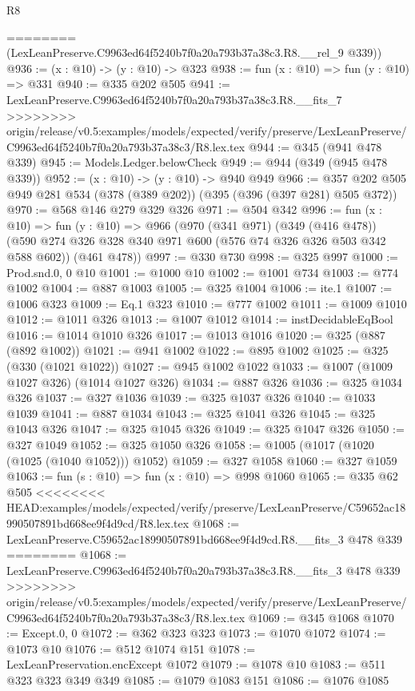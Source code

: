 \begin{lexlean}{R8}
\begin{coremodule}
{{{{{{{{{{{{{{{{{{{{{{{========
      (LexLeanPreserve.C9963ed64f5240b7f0a20a793b37a38c3.R8.__rel_9 @339))
@936 := (x : @10) -> (y : @10) -> @323
@938 := fun (x : @10) => fun (y : @10) => @331
@940 := @335 @202 @505
@941 := LexLeanPreserve.C9963ed64f5240b7f0a20a793b37a38c3.R8.__fits_7
>>>>>>>> origin/release/v0.5:examples/models/expected/verify/preserve/LexLeanPreserve/C9963ed64f5240b7f0a20a793b37a38c3/R8.lex.tex
@944 := @345 (@941 @478 @339)
@945 := Models.Ledger.belowCheck
@949 := @944 (@349 (@945 @478 @339))
@952 := (x : @10) -> (y : @10) -> @940 @949
@966 := @357 @202 @505 @949 @281 @534 (@378 (@389 @202)) (@395 (@396 (@397 @281) @505 @372))
@970 := @568 @146 @279 @329 @326
@971 := @504 @342
@996 := fun (x : @10) =>
  fun (y : @10) =>
  @966
    (@970
      (@341 @971)
      (@349 (@416 @478))
      (@590 @274 @326 @328 @340 @971 @600 (@576 @74 @326 @326 @503 @342 @588 @602))
      (@461 @478))
@997 := @330 @730
@998 := @325 @997
@1000 := Prod.snd.{0, 0} @10
@1001 := @1000 @10
@1002 := @1001 @734
@1003 := @774 @1002
@1004 := @887 @1003
@1005 := @325 @1004
@1006 := ite.{1}
@1007 := @1006 @323
@1009 := Eq.{1} @323
@1010 := @777 @1002
@1011 := @1009 @1010
@1012 := @1011 @326
@1013 := @1007 @1012
@1014 := instDecidableEqBool
@1016 := @1014 @1010 @326
@1017 := @1013 @1016
@1020 := @325 (@887 (@892 @1002))
@1021 := @941 @1002
@1022 := @895 @1002
@1025 := @325 (@330 (@1021 @1022))
@1027 := @945 @1002 @1022
@1033 := @1007 (@1009 @1027 @326) (@1014 @1027 @326)
@1034 := @887 @326
@1036 := @325 @1034 @326
@1037 := @327 @1036
@1039 := @325 @1037 @326
@1040 := @1033 @1039
@1041 := @887 @1034
@1043 := @325 @1041 @326
@1045 := @325 @1043 @326
@1047 := @325 @1045 @326
@1049 := @325 @1047 @326
@1050 := @327 @1049
@1052 := @325 @1050 @326
@1058 := @1005 (@1017 (@1020 (@1025 (@1040 @1052))) @1052)
@1059 := @327 @1058
@1060 := @327 @1059
@1063 := fun (s : @10) => fun (x : @10) => @998 @1060
@1065 := @335 @62 @505
<<<<<<<< HEAD:examples/models/expected/verify/preserve/LexLeanPreserve/C59652ac18990507891bd668ee9f4d9cd/R8.lex.tex
@1068 := LexLeanPreserve.C59652ac18990507891bd668ee9f4d9cd.R8.__fits_3 @478 @339
========
@1068 := LexLeanPreserve.C9963ed64f5240b7f0a20a793b37a38c3.R8.__fits_3 @478 @339
>>>>>>>> origin/release/v0.5:examples/models/expected/verify/preserve/LexLeanPreserve/C9963ed64f5240b7f0a20a793b37a38c3/R8.lex.tex
@1069 := @345 @1068
@1070 := Except.{0, 0}
@1072 := @362 @323 @323
@1073 := @1070 @1072
@1074 := @1073 @10
@1076 := @512 @1074 @151
@1078 := LexLeanPreservation.encExcept @1072
@1079 := @1078 @10
@1083 := @511 @323 @323 @349 @349
@1085 := @1079 @1083 @151
@1086 := @1076 @1085
}}}}}}}}}}}}}}}}}}}}}}}
\end{coremodule}
\end{lexlean}
